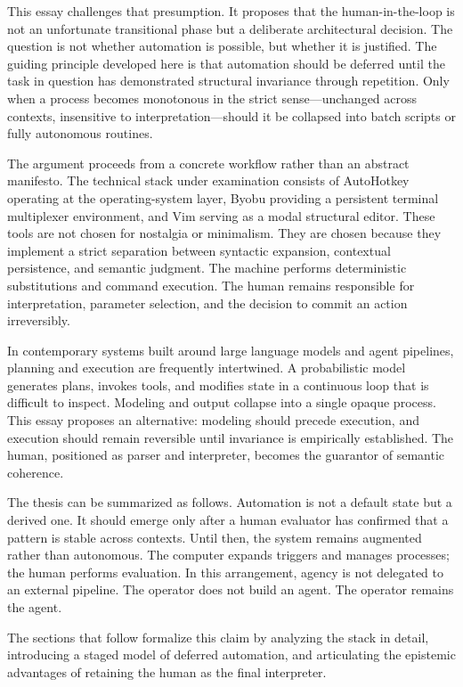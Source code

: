\documentclass[11pt]{article}
\begin{document}
This essay challenges that presumption. It proposes that the human-in-the-loop is not an unfortunate transitional phase but a deliberate architectural decision. The question is not whether automation is possible, but whether it is justified. The guiding principle developed here is that automation should be deferred until the task in question has demonstrated structural invariance through repetition. Only when a process becomes monotonous in the strict sense—unchanged across contexts, insensitive to interpretation—should it be collapsed into batch scripts or fully autonomous routines.

The argument proceeds from a concrete workflow rather than an abstract manifesto. The technical stack under examination consists of AutoHotkey operating at the operating-system layer, Byobu providing a persistent terminal multiplexer environment, and Vim serving as a modal structural editor. These tools are not chosen for nostalgia or minimalism. They are chosen because they implement a strict separation between syntactic expansion, contextual persistence, and semantic judgment. The machine performs deterministic substitutions and command execution. The human remains responsible for interpretation, parameter selection, and the decision to commit an action irreversibly.

In contemporary systems built around large language models and agent pipelines, planning and execution are frequently intertwined. A probabilistic model generates plans, invokes tools, and modifies state in a continuous loop that is difficult to inspect. Modeling and output collapse into a single opaque process. This essay proposes an alternative: modeling should precede execution, and execution should remain reversible until invariance is empirically established. The human, positioned as parser and interpreter, becomes the guarantor of semantic coherence.

The thesis can be summarized as follows. Automation is not a default state but a derived one. It should emerge only after a human evaluator has confirmed that a pattern is stable across contexts. Until then, the system remains augmented rather than autonomous. The computer expands triggers and manages processes; the human performs evaluation. In this arrangement, agency is not delegated to an external pipeline. The operator does not build an agent. The operator remains the agent.

The sections that follow formalize this claim by analyzing the stack in detail, introducing a staged model of deferred automation, and articulating the epistemic advantages of retaining the human as the final interpreter.
\end{document}
